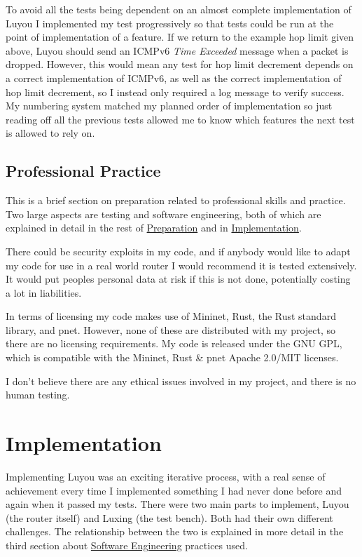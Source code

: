 \documentclass[12pt,a4paper,twoside,openright]{report}
\begin{document}
\bigskip

To avoid all the tests being dependent on an almost complete implementation of Luyou I implemented my test progressively so that tests could be run at the point of implementation of a feature. If we return to the example hop limit given above, Luyou should send an ICMPv6 \textit{Time Exceeded} message when a packet is dropped.  However, this would mean any test for hop limit decrement depends on a correct implementation of ICMPv6, as well as the correct implementation of hop limit decrement, so I instead only required a log message to verify success.  My numbering system matched my planned order of implementation so just reading off all the previous tests allowed me to know which features the next test is allowed to rely on.  

\section{Professional Practice}
This is a brief section on preparation related to professional skills and practice.  Two large aspects are testing and software engineering, both of which are explained in detail in the rest of \hyperref[chap::preparation]{Preparation} and in \hyperref[chap::implementation]{Implementation}.  

\bigskip

There could be security exploits in my code, and if anybody would like to adapt my code for use in a real world router I would recommend it is tested extensively.  It would put peoples personal data at risk if this is not done, potentially costing a lot in liabilities.

\bigskip

In terms of licensing my code makes use of Mininet, Rust, the Rust standard library, and pnet.  However, none of these are distributed with my project, so there are no licensing requirements. My code is released under the GNU GPL\cite{gpl}, which is compatible with the Mininet, Rust \& pnet Apache 2.0/MIT licenses.

\bigskip

I don't believe there are any ethical issues involved in my project, and there is no human testing.

\chapter{Implementation}
\label{chap::implementation}

Implementing Luyou was an exciting iterative process, with a real sense of achievement every time I implemented something I had never done before and again when it passed my tests.  There were two main parts to implement, Luyou (the router itself) and Luxing (the test bench).  Both had their own different challenges.  The relationship between the two is explained in more detail in the third section about \hyperref[sec::soft_eng] {Software Engineering} practices used.
\end{document}
